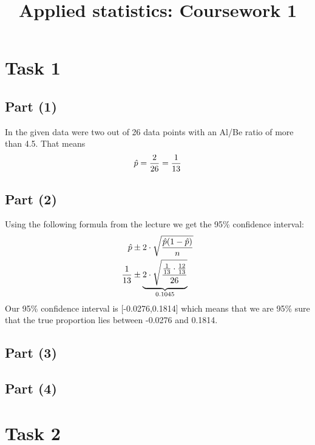 \documentclass[british,a4paper,order=firstname]{mathscript}
\title{\textbf{Applied statistics: Coursework 1}}
\author{\person{Henry Haustein}}
\begin{document}
\pagestyle{plain}

\maketitle

\hypertarget{tocpage}{}
\tableofcontents
{}

\pagebreak
{}
\pagestyle{fancy}

\section{Task 1}
\subsection{Part (1)}
In the given data were two out of 26 data points with an Al/Be ratio of more than 4.5. That means
\begin{align}
	\hat{p} = \frac{2}{26} = \frac{1}{13}\notag
\end{align}

\subsection{Part (2)}
Using the following formula from the lecture we get the 95\% confidence interval:
\begin{align}
	\hat{p}&\pm 2\cdot\sqrt{\frac{\hat{p}(1-\hat{p})}{n}} \notag \\
	\frac{1}{13} &\pm \underbrace{2\cdot\sqrt{\frac{\frac{1}{13}\cdot\frac{12}{13}}{26}}}_{0.1045} \notag
\end{align}
Our 95\% confidence interval is [-0.0276,0.1814] which means that we are 95\% sure that the true proportion lies between -0.0276 and 0.1814. 

\subsection{Part (3)}

\subsection{Part (4)}

\pagebreak
\section{Task 2}
\end{document}
